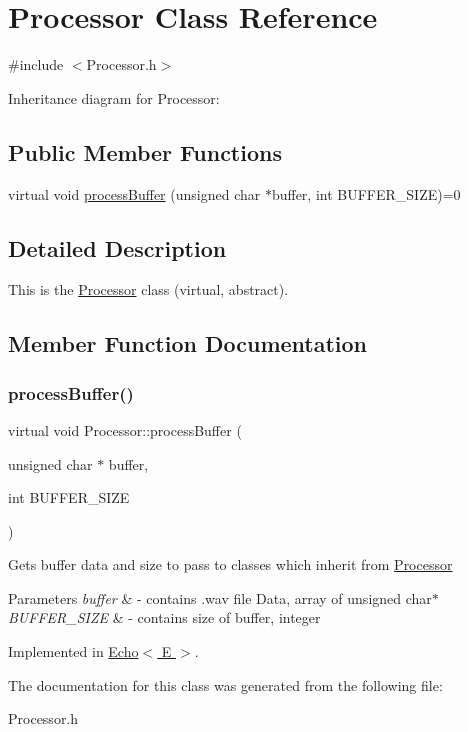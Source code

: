 \hypertarget{classProcessor}{}\section{Processor Class Reference}
\label{classProcessor}


{\ttfamily \#include $<$Processor.\+h$>$}



Inheritance diagram for Processor\+:
\subsection*{Public Member Functions}
\begin{DoxyCompactItemize}
\item 
virtual void \hyperlink{classProcessor_a13e6240144c7a530079b0e2ae4a4526d}{process\+Buffer} (unsigned char $\ast$buffer, int B\+U\+F\+F\+E\+R\+\_\+\+S\+I\+ZE)=0
\end{DoxyCompactItemize}


\subsection{Detailed Description}
This is the \hyperlink{classProcessor}{Processor} class (virtual, abstract). 

\subsection{Member Function Documentation}
\mbox{\label{classProcessor_a13e6240144c7a530079b0e2ae4a4526d}} 
\subsubsection{\texorpdfstring{process\+Buffer()}{processBuffer()}}
{\footnotesize\ttfamily virtual void Processor\+::process\+Buffer (\begin{DoxyParamCaption}\item[{unsigned char $\ast$}]{buffer,  }\item[{int}]{B\+U\+F\+F\+E\+R\+\_\+\+S\+I\+ZE }\end{DoxyParamCaption})\hspace{0.3cm}{\ttfamily [pure virtual]}}

Gets buffer data and size to pass to classes which inherit from \hyperlink{classProcessor}{Processor} 
\begin{DoxyParams}{Parameters}
{\em buffer} & -\/ contains .wav file Data, array of unsigned char$\ast$ \\
\hline
{\em B\+U\+F\+F\+E\+R\+\_\+\+S\+I\+ZE} & -\/ contains size of buffer, integer \\
\hline
\end{DoxyParams}


Implemented in \hyperlink{classEcho_a3e23a70d522b79ef1e5b9df90c2af183}{Echo$<$ E $>$}.



The documentation for this class was generated from the following file\+:\begin{DoxyCompactItemize}
\item 
Processor.\+h\end{DoxyCompactItemize}
